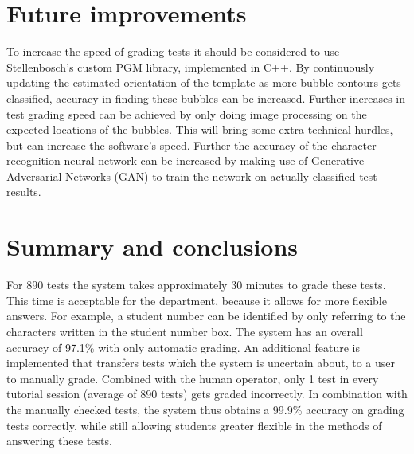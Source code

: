 \section{Future improvements}
To increase the speed of grading tests it should be considered to use Stellenbosch's custom PGM library, implemented in C++. By continuously updating the estimated orientation of the template as more bubble contours gets classified, accuracy in finding these bubbles can be increased. Further increases in test grading speed can be achieved by only doing image processing on the expected locations of the bubbles. This will bring some extra technical hurdles, but can increase the software's speed. Further the accuracy of the character recognition neural network can be increased by making use of Generative Adversarial Networks (GAN) to train the network on actually classified test results.

\section{Summary and conclusions}
For 890 tests the system takes approximately 30 minutes to grade these tests. This time is acceptable for the department, because it allows for more flexible answers. For example, a student number can be identified by only referring to the characters written in the student number box. The system has an overall accuracy of 97.1\% with only automatic grading. An additional feature is implemented that transfers tests which the system is uncertain about, to a user to manually grade. Combined with the human operator, only 1 test in every tutorial session (average of 890 tests) gets graded incorrectly. In combination with the manually checked tests, the system thus obtains a 99.9\% accuracy on grading tests correctly, while still allowing students greater flexible in the methods of answering these tests.